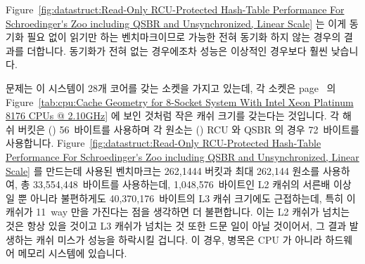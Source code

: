 Figure~\ref{fig:datastruct:Read-Only RCU-Protected Hash-Table Performance For Schroedinger's Zoo including QSBR and Unsynchronized, Linear Scale}
는 이게 동기화 필요 없이 읽기만 하는 벤치마크이므로 가능한 전혀 동기화 하지
않는 경우의 결과를 더합니다.
동기화가 전혀 없는 경우에조차 성능은 이상적인 경우보다 훨씬 낮습니다.

문제는 이 시스템이 28개 코어를 갖는 소켓을 가지고 있는데, 각 소켓은
page~\pageref{tab:cpu:Cache Geometry for 8-Socket System With Intel Xeon Platinum 8176 CPUs @ 2.10GHz}
의 Figure~\ref{tab:cpu:Cache Geometry for 8-Socket System With Intel Xeon Platinum 8176 CPUs @ 2.10GHz}
에 보인 것처럼 작은 캐쉬 크기를 갖는다는 것입니다.
각 해쉬 버킷은 () 56~바이트를 사용하며 각 원소는
() RCU 와 QSBR 의 경우 72~바이트를 사용합니다.
Figure~\ref{fig:datastruct:Read-Only RCU-Protected Hash-Table Performance For Schroedinger's Zoo including QSBR and Unsynchronized, Linear Scale}
를 만드는데 사용된 벤치마크는 262,1444 버킷과 최대 262,144 원소를 사용하여, 총
33,554,448~바이트를 사용하는데, 1,048,576~바이트인 L2 캐쉬의 서른배 이상일 뿐
아니라 불편하게도 40,370,176~바이트의 L3 캐쉬 크기에도 근접하는데, 특히 이
캐쉬가 11~way 만을 가진다는 점을 생각하면 더 불편합니다.
이는 L2 캐쉬가 넘치는 것은 항상 있을 것이고 L3 캐쉬가 넘치는 것 또한 드문 일이
아닐 것이어서, 그 결과 발생하는 캐쉬 미스가 성능을 하락시킬 겁니다.
이 경우, 병목은 CPU 가 아니라 하드웨어 메모리 시스템에 있습니다.

\iffalse

